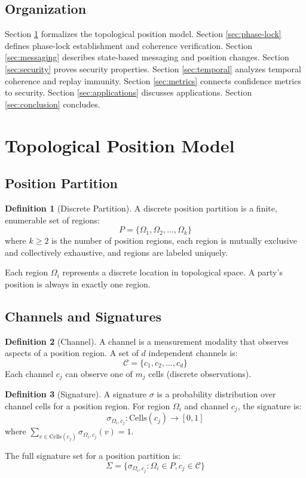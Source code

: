\documentclass[11pt,a4paper]{article}
\theoremstyle{definition}
\newtheorem{definition}{Definition}[section]
\begin{document}
\subsection{Organization}

Section \ref{sec:model} formalizes the topological position model. Section \ref{sec:phase-lock} defines phase-lock establishment and coherence verification. Section \ref{sec:messaging} describes state-based messaging and position changes. Section \ref{sec:security} proves security properties. Section \ref{sec:temporal} analyzes temporal coherence and replay immunity. Section \ref{sec:metrics} connects confidence metrics to security. Section \ref{sec:applications} discusses applications. Section \ref{sec:conclusion} concludes.

\section{Topological Position Model}
\label{sec:model}

\subsection{Position Partition}

\begin{definition}[Discrete Partition]
A discrete position partition is a finite, enumerable set of regions:
\[
P = \{\Omega_1, \Omega_2, \ldots, \Omega_k\}
\]
where $k \geq 2$ is the number of position regions, each region is mutually exclusive and collectively exhaustive, and regions are labeled uniquely.
\end{definition}

Each region $\Omega_i$ represents a discrete location in topological space. A party's position is always in exactly one region.

\subsection{Channels and Signatures}

\begin{definition}[Channel]
A channel is a measurement modality that observes aspects of a position region. A set of $d$ independent channels is:
\[
\mathcal{C} = \{c_1, c_2, \ldots, c_d\}
\]
Each channel $c_j$ can observe one of $m_j$ cells (discrete observations).
\end{definition}

\begin{definition}[Signature]
A signature $\sigma$ is a probability distribution over channel cells for a position region. For region $\Omega_i$ and channel $c_j$, the signature is:
\[
\sigma_{\Omega_i, c_j} : \text{Cells}(c_j) \to [0,1]
\]
where $\sum_{v \in \text{Cells}(c_j)} \sigma_{\Omega_i, c_j}(v) = 1$.

The full signature set for a position partition is:
\[
\Sigma = \{\sigma_{\Omega_i, c_j} : \Omega_i \in P, c_j \in \mathcal{C}\}
\]
\end{definition}
\end{document}
